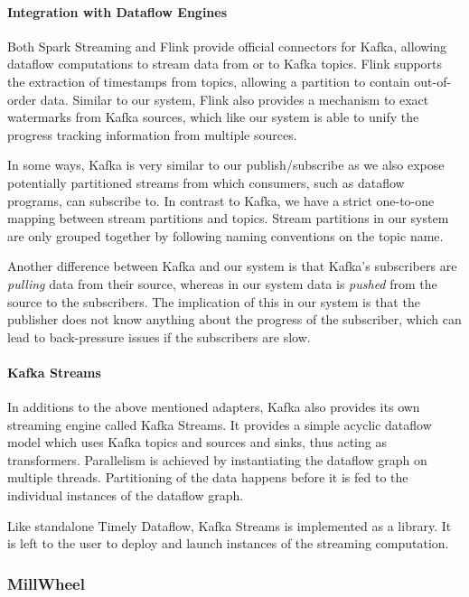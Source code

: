 \paragraph{Integration with Dataflow Engines}

Both Spark Streaming and Flink provide official connectors for Kafka, allowing
dataflow computations to stream data from or to Kafka topics. Flink supports
the extraction of timestamps from topics, allowing a partition
to contain out-of-order data. Similar to our system, Flink also provides a
mechanism to exact watermarks from Kafka sources, which like our system
is able to unify the progress tracking information from multiple sources.

In some ways, Kafka is very similar to our publish/subscribe as we also expose
potentially partitioned streams from which consumers, such as dataflow programs,
can subscribe to. In contrast to Kafka, we have a strict one-to-one mapping between stream
partitions and topics. Stream partitions in our system are only grouped together
by following naming conventions on the topic name. 
 
Another difference between Kafka and our system is that Kafka's subscribers are
\emph{pulling} data from their source, whereas in our system data is \emph{pushed}
from the source to the subscribers. The implication of this in our
system is that the publisher does not know anything about the progress of the
subscriber, which can lead to back-pressure issues if the subscribers are
slow.

\paragraph{Kafka Streams}
In additions to the above mentioned adapters, Kafka also provides its own
streaming engine called Kafka Streams. It provides a simple acyclic dataflow
model which uses Kafka topics and sources and sinks, thus acting as transformers.
Parallelism is achieved by instantiating the dataflow graph on multiple threads.
Partitioning of the data happens before it is fed to the individual instances
of the dataflow graph.

Like standalone Timely Dataflow, Kafka Streams is implemented as a library. It
is left to the user to deploy and launch instances of the streaming computation.

\subsubsection{MillWheel}


